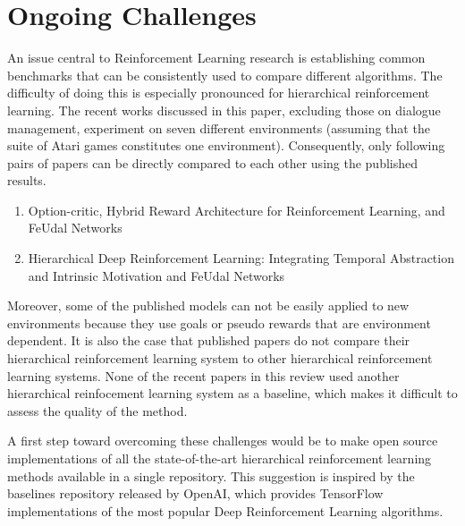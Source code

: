 \section{Ongoing Challenges}
An issue central to Reinforcement Learning research is establishing common benchmarks
that can be consistently used to compare different algorithms. The difficulty of
doing this is especially pronounced for hierarchical reinforcement learning.
The recent works discussed in this paper, excluding those on dialogue management,
experiment on seven different environments (assuming that the suite of Atari games
constitutes one environment). Consequently, only following pairs of papers
can be directly compared to each other using the published results.

\begin{enumerate}
    \item Option-critic, Hybrid Reward Architecture for Reinforcement Learning, and
          FeUdal Networks
    \item Hierarchical Deep Reinforcement Learning: Integrating Temporal Abstraction
          and Intrinsic Motivation and FeUdal Networks
\end{enumerate}

Moreover, some of the published models can not be easily applied to new environments because
they use goals or pseudo rewards that are environment dependent. It is also the case
that published papers do not compare their hierarchical reinforcement learning system to
other hierarchical reinforcement learning systems. None of the recent papers in this review
used another hierarchical reinfocement learning system as a baseline, which makes it difficult
to assess the quality of the method.

A first step toward overcoming these challenges would be to make open source implementations
of all the state-of-the-art hierarchical reinforcement learning methods available in a single repository.
This suggestion is inspired by the baselines repository released by OpenAI, which provides TensorFlow
implementations of the most popular Deep Reinforcement Learning algorithms.


